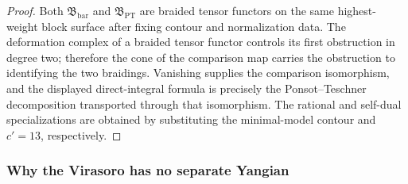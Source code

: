 \begin{proof}
Both $\mathfrak B_{\mathrm{bar}}$ and $\mathfrak B_{\mathrm{PT}}$ are
braided tensor functors on the same highest-weight block surface after
fixing contour and normalization data. The deformation complex of a
braided tensor functor controls its first obstruction in degree two;
therefore the cone of the comparison map carries the obstruction to
identifying the two braidings. Vanishing supplies the comparison
isomorphism, and the displayed direct-integral formula is precisely
the Ponsot--Teschner decomposition transported through that
isomorphism. The rational and self-dual specializations are obtained
by substituting the minimal-model contour and $c'=13$, respectively.
\end{proof}

\subsubsection{Why the Virasoro has no separate Yangian}
\label{subsubsec:virasoro-no-separate-yangian}


